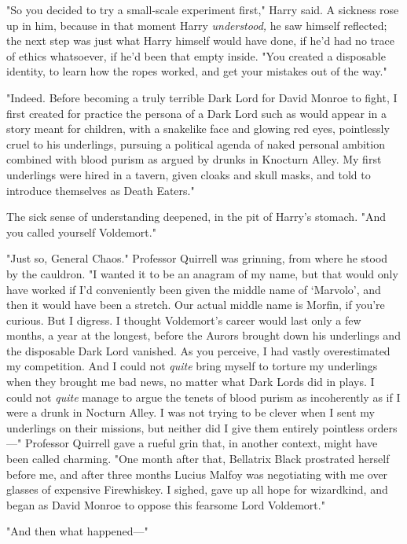 "So you decided to try a small-scale experiment first," Harry said. A sickness 
rose up in him, because in that moment Harry \emph{understood,} he saw himself 
reflected; the next step was just what Harry himself would have done, if he'd 
had no trace of ethics whatsoever, if he'd been that empty inside. "You created 
a disposable identity, to learn how the ropes worked, and get your mistakes out 
of the way."

"Indeed. Before becoming a truly terrible Dark Lord for David Monroe to fight, 
I first created for practice the persona of a Dark Lord such as would appear in 
a story meant for children, with a snakelike face and glowing red eyes, 
pointlessly cruel to his underlings, pursuing a political agenda of naked 
personal ambition combined with blood purism as argued by drunks in Knocturn 
Alley. My first underlings were hired in a tavern, given cloaks and skull 
masks, and told to introduce themselves as Death Eaters."

The sick sense of understanding deepened, in the pit of Harry's stomach. "And 
you called yourself Voldemort."

"Just so, General Chaos." Professor Quirrell was grinning, from where he stood 
by the cauldron. "I wanted it to be an anagram of my name, but that would only 
have worked if I'd conveniently been given the middle name of `Marvolo', and 
then it would have been a stretch. Our actual middle name is Morfin, if you're 
curious. But I digress. I thought Voldemort's career would last only a few 
months, a year at the longest, before the Aurors brought down his underlings 
and the disposable Dark Lord vanished. As you perceive, I had vastly 
overestimated my competition. And I could not \emph{quite} bring myself to 
torture my underlings when they brought me bad news, no matter what Dark Lords 
did in plays. I could not \emph{quite} manage to argue the tenets of blood 
purism as incoherently as if I were a drunk in Nocturn Alley. I was not trying 
to be clever when I sent my underlings on their missions, but neither did I 
give them entirely pointless orders---" Professor Quirrell gave a rueful grin 
that, in another context, might have been called charming. "One month after 
that, Bellatrix Black prostrated herself before me, and after three months 
Lucius Malfoy was negotiating with me over glasses of expensive Firewhiskey. I 
sighed, gave up all hope for wizardkind, and began as David Monroe to oppose 
this fearsome Lord Voldemort."

"And then what happened---"

